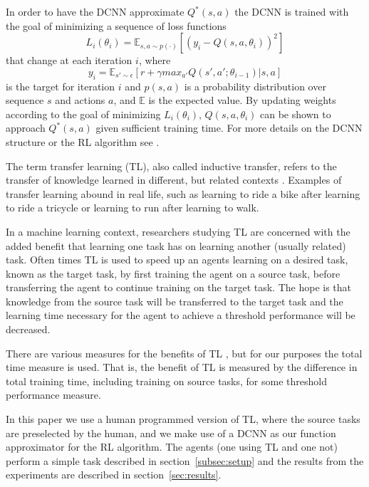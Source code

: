\documentclass{llncs}
\begin{document}
In order to have the DCNN approximate $Q^{*}(s,a)$ the DCNN is trained with the goal of minimizing a sequence of loss functions 
\begin{equation}
L_{i}(\theta_{i}) = {\mathbb{E}}_{s,a \sim p(\cdot)}[(y_{i}-Q(s,a,\theta_{i}))^{2}]
\end{equation}
that change at each iteration $i$, where 
\begin{equation}
y_{i}={\mathbb{E}}_{s' \sim \epsilon} [r + \gamma max_{a'} Q(s',a';\theta_{i-1}) | s,a]
\end{equation}
is the target for iteration $i$ and $p(s,a)$ is a probability distribution over sequence $s$ and actions $a$, and $\mathbb{E}$ is the expected value. 
By updating weights according to the goal of minimizing $L_{i}(\theta_{i})$, $Q(s,a,\theta_{i})$ can be shown to approach $Q^{*}(s,a)$ given sufficient training time. 
For more details on the DCNN structure or the RL algorithm see \citep{mnih2015human}.

The term transfer learning (TL), also called inductive transfer, refers to the transfer of knowledge learned in different, but related contexts \citep{ramon2007transfer}.
Examples of transfer learning abound in real life, such as learning to ride a bike after learning to ride a tricycle or learning to run after learning to walk. 

In a machine learning context, researchers studying TL are concerned with the added benefit that learning one task has on learning another (usually related) task.
Often times TL is used to speed up an agents learning on a desired task, known as the target task, by first training the agent on a source task, before transferring the agent to continue training on the target task. 
The hope is that knowledge from the source task will be transferred to the target task and the learning time necessary for the agent to achieve a threshold performance will be decreased. 

There are various measures for the benefits of TL \citep{taylor2009transfer}, but for our purposes the total time measure is used.
That is, the benefit of TL is measured by the difference in total training time, including training on source tasks, for some threshold performance measure. 

In this paper we use a human programmed version of TL, where the source tasks are preselected by the human, and we make use of a DCNN as our function approximator for the RL algorithm.
The agents (one using TL and one not) perform a simple task described in section~\ref{subsec:setup} and the results from the experiments are described in section~\ref{sec:results}.
\end{document}
